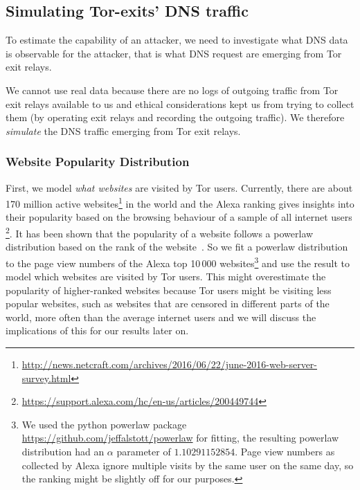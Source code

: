 \subsection{Simulating Tor-exits' DNS traffic}
\label{sec:attack:sim}
To estimate the capability of an attacker, we need to investigate what
DNS data is observable for the attacker, that is what DNS request are
emerging from Tor exit relays.

We cannot use real data because there are no logs of outgoing traffic
from Tor exit relays available to us and ethical considerations kept us
from trying to collect them (\eg by operating exit relays and recording
the outgoing traffic). We therefore \emph{simulate} the DNS traffic
emerging from Tor exit relays.

\subsubsection{Website Popularity Distribution}
First, we model \emph{what websites} are visited by Tor users.
Currently, there are about 170 million active
websites\footnote{\url{http://news.netcraft.com/archives/2016/06/22/june-2016-web-server-survey.html}}
in the world and the Alexa ranking gives insights into their popularity
based on the browsing behaviour of a sample of all internet users
\footnote{\url{https://support.alexa.com/hc/en-us/articles/200449744}}.
It has been shown that the popularity of a website follows a powerlaw
distribution based on the rank of the
website~\cite{DBLP:journals/network/MahantiCMAW13}. So
we fit a powerlaw distribution to the page view numbers of the Alexa top
10\,000 websites\footnote{We used the python powerlaw package
		\url{https://github.com/jeffalstott/powerlaw} for fitting, the
		resulting powerlaw distribution had an $\alpha$ parameter of
		$1.10291152854$. Page view numbers as collected by Alexa ignore
		multiple visits by the same user on the same day, so the ranking
		might be slightly off for our purposes.} and use the result to
model which websites are visited by Tor users.
This might overestimate the popularity of higher-ranked websites because
Tor users might be visiting less popular websites, such as websites that
are censored in different parts of the world, more often than the
average internet users and we will discuss the implications of this for
our results later on.


